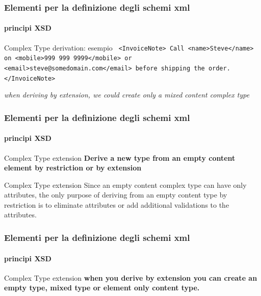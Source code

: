 \begin{frame}
	\frametitle{Elementi per la definizione degli schemi xml}
	\framesubtitle{principi XSD}
	\addtocounter{nframe}{1}

	\begin{block}{Complex Type derivation: esempio}
		\texttt{
			<InvoiceNote>
			Call <name>Steve</name> on <mobile>999 999 9999</mobile> or <email>steve@somedomain.com</email> before shipping the order.
			</InvoiceNote>
		}
	\end{block}
	\textit{when deriving by extension, we could create only a mixed content complex type}
\end{frame}

\begin{frame}
	\frametitle{Elementi per la definizione degli schemi xml}
	\framesubtitle{principi XSD}
	\addtocounter{nframe}{1}

	\begin{block}{Complex Type extension}
		\textbf{Derive a new type from an empty content element by restriction or by extension}
	\end{block}

	\begin{block}{Complex Type extension}
		Since an empty content complex type can have only attributes, the only purpose of deriving from an empty content type by restriction is to eliminate attributes or add additional validations to the attributes.
	\end{block}
\end{frame}





\begin{frame}
	\frametitle{Elementi per la definizione degli schemi xml}
	\framesubtitle{principi XSD}
	\addtocounter{nframe}{1}

	\begin{block}{Complex Type extension}
		\textbf{ when you derive by extension you can create an empty type, mixed type or element only content type.}
	\end{block}

\end{frame}


